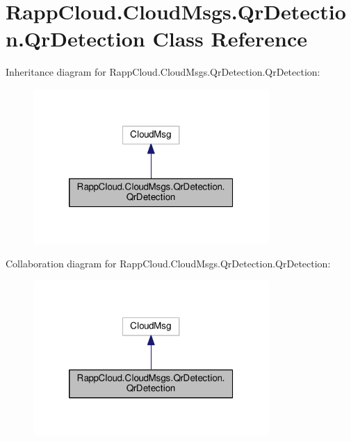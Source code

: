 \hypertarget{classRappCloud_1_1CloudMsgs_1_1QrDetection_1_1QrDetection}{\section{Rapp\-Cloud.\-Cloud\-Msgs.\-Qr\-Detection.\-Qr\-Detection Class Reference}
\label{classRappCloud_1_1CloudMsgs_1_1QrDetection_1_1QrDetection}
}


Inheritance diagram for Rapp\-Cloud.\-Cloud\-Msgs.\-Qr\-Detection.\-Qr\-Detection\-:
\nopagebreak
\begin{figure}[H]
\begin{center}
\leavevmode
\includegraphics[width=254pt]{classRappCloud_1_1CloudMsgs_1_1QrDetection_1_1QrDetection__inherit__graph}
\end{center}
\end{figure}


Collaboration diagram for Rapp\-Cloud.\-Cloud\-Msgs.\-Qr\-Detection.\-Qr\-Detection\-:
\nopagebreak
\begin{figure}[H]
\begin{center}
\leavevmode
\includegraphics[width=254pt]{classRappCloud_1_1CloudMsgs_1_1QrDetection_1_1QrDetection__coll__graph}
\end{center}
\end{figure}
